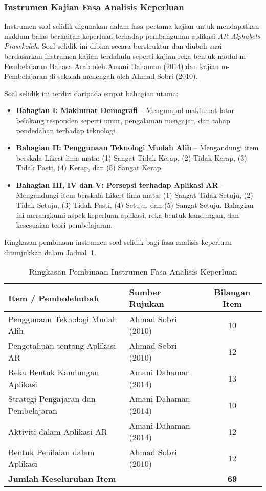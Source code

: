 \subsubsection{Instrumen Kajian Fasa Analisis Keperluan}

Instrumen soal selidik digunakan dalam fasa pertama kajian untuk mendapatkan maklum balas berkaitan keperluan terhadap pembangunan aplikasi \textit{AR Alphabets Prasekolah}. Soal selidik ini dibina secara berstruktur dan diubah suai berdasarkan instrumen kajian terdahulu seperti kajian reka bentuk modul m-Pembelajaran Bahasa Arab oleh Amani Dahaman (2014) dan kajian m-Pembelajaran di sekolah menengah oleh Ahmad Sobri (2010).

Soal selidik ini terdiri daripada empat bahagian utama:

\begin{itemize}
  \item \textbf{Bahagian I: Maklumat Demografi} – Mengumpul maklumat latar belakang responden seperti umur, pengalaman mengajar, dan tahap pendedahan terhadap teknologi.
  \item \textbf{Bahagian II: Penggunaan Teknologi Mudah Alih} – Mengandungi item berskala Likert lima mata: (1) Sangat Tidak Kerap, (2) Tidak Kerap, (3) Tidak Pasti, (4) Kerap, dan (5) Sangat Kerap.
  \item \textbf{Bahagian III, IV dan V: Persepsi terhadap Aplikasi AR} – Mengandungi item berskala Likert lima mata: (1) Sangat Tidak Setuju, (2) Tidak Setuju, (3) Tidak Pasti, (4) Setuju, dan (5) Sangat Setuju. Bahagian ini merangkumi aspek keperluan aplikasi, reka bentuk kandungan, dan kesesuaian teori pembelajaran.
\end{itemize}

Ringkasan pembinaan instrumen soal selidik bagi fasa analisis keperluan ditunjukkan dalam Jadual~\ref{jadual:instrumenAnalisis}.
\begin{table}[h]
\centering
\caption{Ringkasan Pembinaan Instrumen Fasa Analisis Keperluan}
\label{jadual:instrumenAnalisis}
\begin{tabular}{|p{6cm}|p{5cm}|c|}
\hline
\textbf{Item / Pembolehubah} & \textbf{Sumber Rujukan} & \textbf{Bilangan Item} \\
\hline
Penggunaan Teknologi Mudah Alih & Ahmad Sobri (2010) & 10 \\
\hline
Pengetahuan tentang Aplikasi AR & Ahmad Sobri (2010) & 12 \\
\hline
Reka Bentuk Kandungan Aplikasi & Amani Dahaman (2014) & 13 \\
\hline
Strategi Pengajaran dan Pembelajaran & Amani Dahaman (2014) & 10 \\
\hline
Aktiviti dalam Aplikasi AR & Amani Dahaman (2014) & 12 \\
\hline
Bentuk Penilaian dalam Aplikasi & Ahmad Sobri (2010) & 12 \\
\hline
\textbf{Jumlah Keseluruhan Item} & & \textbf{69} \\
\hline
\end{tabular}
\end{table}
